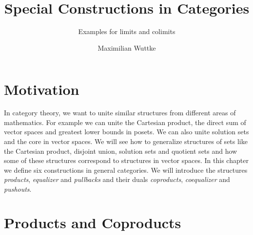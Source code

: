 \def\pathToRoot{../../}

\usepackage{todonotes}

\newcommand{\catA}[0]{\cat{A}}
\newcommand{\catB}[0]{\cat{B}}
\newcommand{\fbar}[0]{\bar{f}}
\newcommand{\ftilde}[0]{\tilde{f}}
\newcommand{\gbar}[0]{\bar{g}}
\newcommand{\gtilde}[0]{\tilde{g}}
\newcommand{\dunion}[0]{\sqcup}
\newcommand{\bigdunion}[0]{\bigsqcup}
\renewcommand{\demph}[1]{\emph{#1}} %

\newcommand{\setOf}[1]{\bigl \{ #1 \bigr \}}
\newcommand{\setMap}[2]{\setOf{#1 \,\big|\, #2}}
\newcommand{\pair}[2]{\bigl( #1 , #2 \bigr)}
\newcommand{\class}[1]{\bigl[ #1 \bigr]}
\newcommand{\choice}[1]{\bigl< #1 \bigr>}
\newcommand{\explainRel}[2]{\stackrel{\text{#1}}{#2}}
\newcommand{\family}[2]{\bigl( #1 \bigr)_{#2}}

\DeclareMathOperator{\core}{core}

\newtheorem{definition}{Definition}
\newtheorem{example}{Example}
\newtheorem{lemma}{Lemma}

\title{Special Constructions in Categories}
\subtitle{Examples for limits and colimits}

\author{Maximilian Wuttke}



\maketitle

\section*{Motivation}

In category theory, we want to unite similar structures from different areas of mathematics.
For example we can unite the Cartesian product, the direct sum of vector spaces and greatest lower bounds in posets.
We can also unite solution sets and the core in vector spaces.
We will see how to generalize structures of sets like the Cartesian product, disjoint union, solution sets and quotient sets and how some of these structures correspond to structures in vector spaces.
In this chapter we define six constructions in general categories.
We will introduce the structures \emph{products}, \emph{equalizer} and \emph{pullbacks} and their duals \emph{coproducts}, \emph{coequalizer} and \emph{pushouts}.

\section*{Products and Coproducts}

